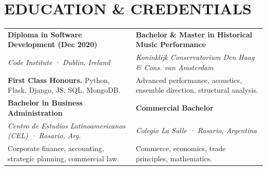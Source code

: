 \documentclass[a4paper]{article}
\begin{document}
\vspace{1pt}

\section*{EDUCATION \& CREDENTIALS}
\begin{tabularx}{\textwidth}{@{}X X@{}}
  \textbf{\fontsize{8}{9.5}\selectfont Diploma in Software Development (Dec 2020)} &
  \textbf{\fontsize{8}{9.5}\selectfont Bachelor \& Master in Historical Music Performance} \\
  \textit{\fontsize{7.5}{9}\selectfont Code Institute · Dublin, Ireland} &
  \textit{\fontsize{7.5}{9}\selectfont Koninklijk Conservatorium Den Haag \& Cons. van Amsterdam} \\
  \fontsize{7.2}{8.6}\selectfont\color{inksoft}
  \textbf{First Class Honours.} Python, Flask, Django, JS, SQL, MongoDB. &
  \fontsize{7.2}{8.6}\selectfont\color{inksoft}
  Advanced performance, acoustics, ensemble direction, structural analysis. \\[1.5pt]
  \textbf{\fontsize{8}{9.5}\selectfont Bachelor in Business Administration} &
  \textbf{\fontsize{8}{9.5}\selectfont Commercial Bachelor} \\
  \textit{\fontsize{7.5}{9}\selectfont Centro de Estudios Latinoamericanos (CEL) · Rosario, Arg.} &
  \textit{\fontsize{7.5}{9}\selectfont Colegio La Salle · Rosario, Argentina} \\
  \fontsize{7.2}{8.6}\selectfont\color{inksoft}
  Corporate finance, accounting, strategic planning, commercial law. &
  \fontsize{7.2}{8.6}\selectfont\color{inksoft}
  Commerce, economics, trade principles, mathematics.
\end{tabularx}
\end{document}
